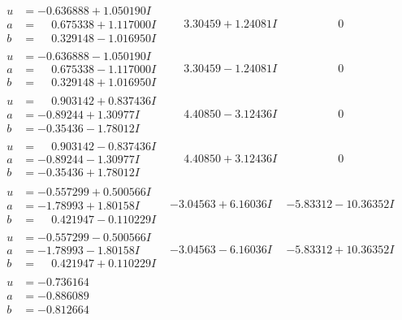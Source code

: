 \documentclass[1p]{elsarticle_modified}
\theoremstyle{definition}
\begin{document}
$$\begin{array}{c|c|c}
\begin{aligned}
u &= -0.636888 + 1.050190 I \\
a &= \phantom{-}0.675338 + 1.117000 I \\
b &= \phantom{-}0.329148 - 1.016950 I\end{aligned}
 & \phantom{-}3.30459 + 1.24081 I & \phantom{-0.000000 } 0 \\ \hline\begin{aligned}
u &= -0.636888 - 1.050190 I \\
a &= \phantom{-}0.675338 - 1.117000 I \\
b &= \phantom{-}0.329148 + 1.016950 I\end{aligned}
 & \phantom{-}3.30459 - 1.24081 I & \phantom{-0.000000 } 0 \\ \hline\begin{aligned}
u &= \phantom{-}0.903142 + 0.837436 I \\
a &= -0.89244 + 1.30977 I \\
b &= -0.35436 - 1.78012 I\end{aligned}
 & \phantom{-}4.40850 - 3.12436 I & \phantom{-0.000000 } 0 \\ \hline\begin{aligned}
u &= \phantom{-}0.903142 - 0.837436 I \\
a &= -0.89244 - 1.30977 I \\
b &= -0.35436 + 1.78012 I\end{aligned}
 & \phantom{-}4.40850 + 3.12436 I & \phantom{-0.000000 } 0 \\ \hline\begin{aligned}
u &= -0.557299 + 0.500566 I \\
a &= -1.78993 + 1.80158 I \\
b &= \phantom{-}0.421947 - 0.110229 I\end{aligned}
 & -3.04563 + 6.16036 I & -5.83312 - 10.36352 I \\ \hline\begin{aligned}
u &= -0.557299 - 0.500566 I \\
a &= -1.78993 - 1.80158 I \\
b &= \phantom{-}0.421947 + 0.110229 I\end{aligned}
 & -3.04563 - 6.16036 I & -5.83312 + 10.36352 I \\ \hline\begin{aligned}
u &= -0.736164\phantom{ +0.000000I} \\
a &= -0.886089\phantom{ +0.000000I} \\
b &= -0.812664\phantom{ +0.000000I}\end{aligned}

\end{array}$$
\end{document}
